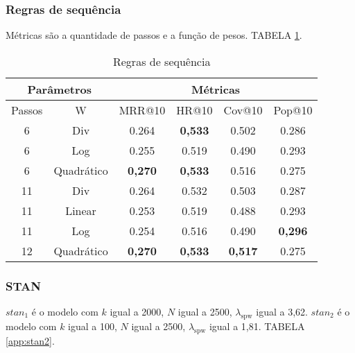 \subsubsection{Regras de sequência}
Métricas são a quantidade de passos e a função de pesos. TABELA \ref{app:sr2}.
\begin{table}[htbp]
    \centering
    \begin{tabular}{|c|c|c|c|c|c|}
        \hline
        \multicolumn{2}{|c|}{Parâmetros} & \multicolumn{4}{c|}{Métricas} \\
        \hline
        Passos & W & MRR@10 & HR@10 & Cov@10 & Pop@10 \\
        \hline
        6 & Div & 0.264 & \textbf{0,533} & 0.502 & 0.286 \\
        \hline
        6 & Log & 0.255 & 0.519 & 0.490 & 0.293 \\
        \hline
        6 & Quadrático & \textbf{0,270} & \textbf{0,533} & 0.516 & 0.275 \\
        \hline
        11 & Div & 0.264 & 0.532 & 0.503 & 0.287 \\
        \hline
        11 & Linear & 0.253 & 0.519 & 0.488 & 0.293 \\
        \hline
        11 & Log & 0.254 & 0.516 & 0.490 & \textbf{0,296} \\
        \hline
        12 & Quadrático & \textbf{0,270} & \textbf{0,533} & \textbf{0,517} & 0.275 \\
        \hline
        \end{tabular}
    \caption{Regras de sequência}
\label{app:sr2}
\end{table}


\subsubsection{STAN}
$stan_1$ é o modelo com $k$ igual a 2000, $N$ igual a 2500, $\lambda_{\text{spw}}$ igual a 3,62.
$stan_2$ é o modelo com $k$ igual a 100, $N$ igual a 2500, $\lambda_{\text{spw}}$ igual a 1,81.
TABELA \ref{app:stan2}.


